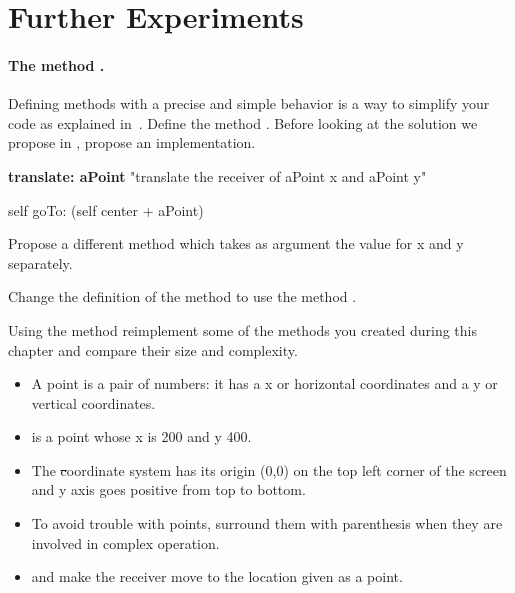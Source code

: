 \section{Further Experiments}
\paragraph{The method .}
Defining methods with a precise and simple behavior is a way to simplify your code as explained in~. Define the method . Before looking at the solution we propose in , propose an implementation. 

\begin{method}\label{mth:translate}
\textbf{translate: aPoint}
   "translate the receiver of aPoint x and aPoint y"
		
   self goTo: (self center + aPoint)	
\end{method}

Propose a different method  which takes as argument the value for x and y separately. 

\begin{exonofig}
Change the definition of the method  to use the method .
\end{exonofig}

\begin{exonofig}
Using the method  reimplement some of the methods you created during this chapter and compare their size and complexity.
\end{exonofig}

\newpage
\summa


\begin{itemize}
\item A point is a pair of numbers: it has a x or horizontal coordinates and a y or vertical coordinates.
\item {} is a point whose x is 200 and y 400.

\item The \st coordinate system has its origin (0,0) on the top left corner of the screen and y axis goes positive from top to bottom.

\item To avoid trouble with points, surround them with parenthesis when they are involved in complex operation.

\item {} and  make the receiver move to the location given as a point.
\end{itemize}

